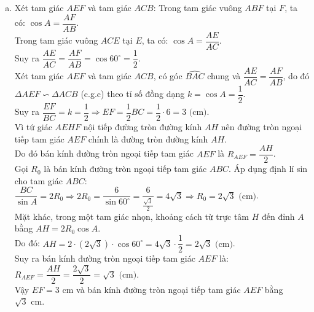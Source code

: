 \begin{bt}
{\begin{enumerate}[a)]
	Do đó $\widehat{BDK} = \widehat{BCD}$, hay $\widehat{BDH} = \widehat{BCD}$.\\
	Mặt khác, trong đường tròn $(O)$, góc $\widehat{BFD}$ và góc $\widehat{BCD}$ là hai góc nội tiếp cùng chắn cung $BD$, nên $\widehat{BFD} = \widehat{BCD}$.\\
	Từ đó suy ra $\widehat{BDH} = \widehat{BFD}$.
	\item Xét tam giác $AEF$ và tam giác $ACB$:
	Trong tam giác vuông $ABF$ tại $F$, ta có: $\cos A = \dfrac{AF}{AB}$.\\
	Trong tam giác vuông $ACE$ tại $E$, ta có: $\cos A = \dfrac{AE}{AC}$.\\
	Suy ra $\dfrac{AE}{AC} = \dfrac{AF}{AB} = \cos 60^\circ = \dfrac{1}{2}$.\\
	Xét tam giác $AEF$ và tam giác $ACB$, có góc $\widehat{BAC}$ chung và $\dfrac{AE}{AC} = \dfrac{AF}{AB}$, do đó $\Delta AEF \backsim \Delta ACB$ (c.g.c) theo tỉ số đồng dạng $k = \cos A = \dfrac{1}{2}$.\\
	Suy ra $\dfrac{EF}{BC} = k = \dfrac{1}{2} \Rightarrow EF = \dfrac{1}{2}BC = \dfrac{1}{2}\cdot 6 = 3\text{ (cm)}$.\\
	Vì tứ giác $AEHF$ nội tiếp đường tròn đường kính $AH$ nên đường tròn ngoại tiếp tam giác $AEF$ chính là đường tròn đường kính $AH$.\\
	Do đó bán kính đường tròn ngoại tiếp tam giác $AEF$ là $R_{AEF} = \dfrac{AH}{2}$.\\
	Gọi $R_0$ là bán kính đường tròn ngoại tiếp tam giác $ABC$. Áp dụng định lí sin cho tam giác $ABC$:
	$\dfrac{BC}{\sin A} = 2R_0 \Rightarrow 2R_0 = \dfrac{6}{\sin 60^\circ} = \dfrac{6}{\frac{\sqrt{3}}{2}} = 4\sqrt{3} \Rightarrow R_0 = 2\sqrt{3}\text{ (cm)}$.\\
	Mặt khác, trong một tam giác nhọn, khoảng cách từ trực tâm $H$ đến đỉnh $A$ bằng $AH = 2R_0 \cos A$.\\
	Do đó: $AH = 2 \cdot (2\sqrt{3}) \cdot \cos 60^\circ = 4\sqrt{3} \cdot \dfrac{1}{2} = 2\sqrt{3}\text{ (cm)}$.\\
	Suy ra bán kính đường tròn ngoại tiếp tam giác $AEF$ là:
	$R_{AEF} = \dfrac{AH}{2} = \dfrac{2\sqrt{3}}{2} = \sqrt{3}\text{ (cm)}$.\\
	Vậy $EF = 3\text{ cm}$ và bán kính đường tròn ngoại tiếp tam giác $AEF$ bằng $\sqrt{3}\text{ cm}$.
\end{enumerate}
}
\end{bt}
